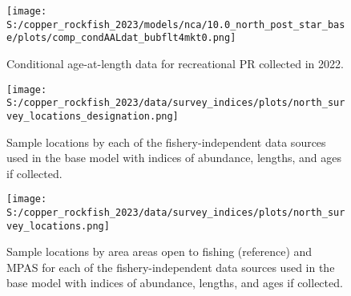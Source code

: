 \documentclass[11pt,
  letterpaper,
]{article}
\begin{document}
\pagebreak

\begin{figure}
{\centering
\texttt{[image: S:/copper\_rockfish\_2023/models/nca/10.0\_north\_post\_star\_base/plots/comp\_condAALdat\_bubflt4mkt0.png]}
}
\caption{Conditional age-at-length data for recreational PR collected in 2022.\label{fig:rec-pr-caal-data}}
\end{figure}

\pagebreak

\begin{figure}
{\centering
\texttt{[image: S:/copper\_rockfish\_2023/data/survey\_indices/plots/north\_survey\_locations\_designation.png]}
}
\caption{Sample locations by each of the fishery-independent data sources used in the base model with indices of abundance, lengths, and ages if collected.\label{fig:survey-locations}}
\end{figure}

\pagebreak

\begin{figure}
{\centering
\texttt{[image: S:/copper\_rockfish\_2023/data/survey\_indices/plots/north\_survey\_locations.png]}
}
\caption{Sample locations by area areas open to fishing (reference) and MPAS for each of the fishery-independent data sources used in the base model with indices of abundance, lengths, and ages if collected.\label{fig:ref-mpa}}
\end{figure}

\pagebreak
\end{document}
